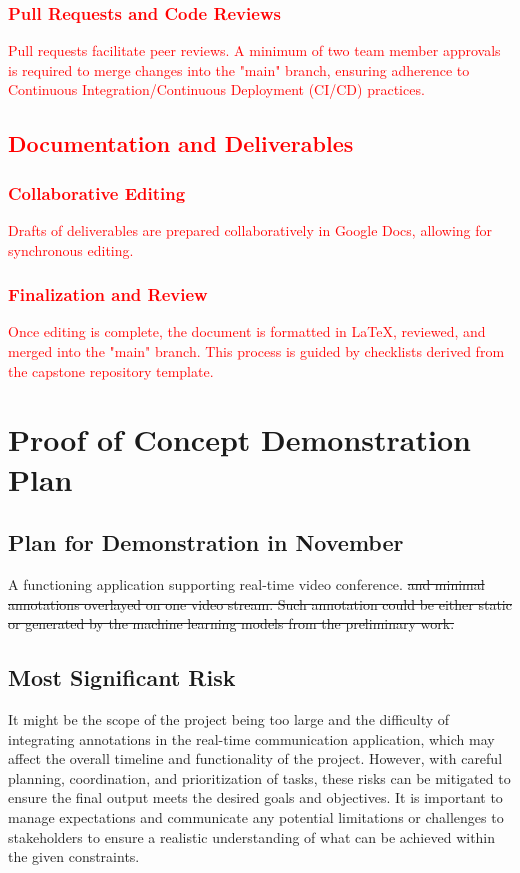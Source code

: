\documentclass{article}
\begin{document}
\subsubsection{\textcolor{red}{Pull Requests and Code Reviews}}
  \textcolor{red}{Pull requests facilitate peer reviews. A minimum of two team 
  member approvals is required to merge changes into the "main" branch, ensuring 
  adherence to Continuous Integration/Continuous Deployment (CI/CD) practices.}

  \subsection{\textcolor{red}{Documentation and Deliverables}}
\subsubsection{\textcolor{red}{Collaborative Editing}}
  \textcolor{red}{Drafts of deliverables are prepared collaboratively in Google 
  Docs, allowing for synchronous editing.}
\subsubsection{\textcolor{red}{Finalization and Review}}
  \textcolor{red}{Once editing is complete, the document is formatted in \LaTeX, 
  reviewed, and merged into the "main" branch. This process is guided by checklists 
  derived from the capstone repository template.}

\section{Proof of Concept Demonstration Plan}

\subsection{Plan for Demonstration in November}

A functioning application supporting real-time video conference. \st{and minimal
  annotations overlayed on one video stream. Such annotation could be either
  static or generated by the machine learning models from the preliminary work.}

\subsection{Most Significant Risk}

It might be the scope of the project being too large and the difficulty of
integrating annotations in the real-time communication application, which may
affect the overall timeline and functionality of the project. However, with
careful planning, coordination, and prioritization of tasks, these risks can be
mitigated to ensure the final output meets the desired goals and objectives. It
is important to manage expectations and communicate any potential limitations or
challenges to stakeholders to ensure a realistic understanding of what can be
achieved within the given constraints.
\end{document}
